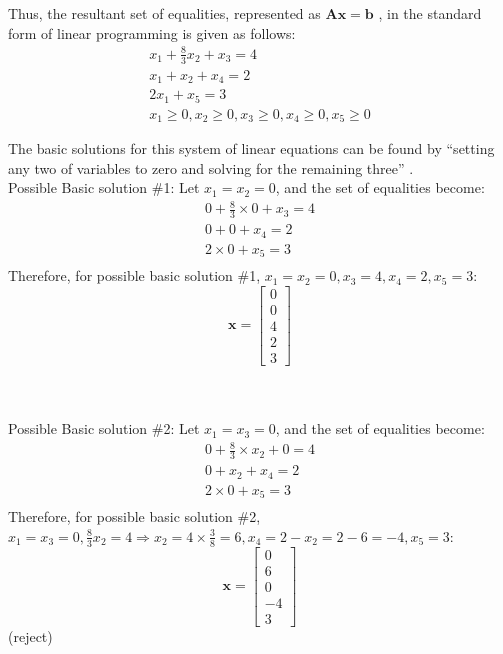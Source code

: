 \documentclass[letter,12pt]{article}
\begin{document}
Thus, the resultant set of equalities, represented as $\mathbf{Ax = b}$ \cite[\S2.1, page 19]{Luenberger2008}, in the standard form \cite[\S2.1, pages 11]{Luenberger2008} of linear programming is given as follows:
\begin{eqnarray*}
x_{1} + \frac{8}{3}x_{2} + x_{3} = 4 \\
x_{1} + x_{2} + x_{4} = 2 \\
2x_{1} + x_{5} = 3 \\
x_{1} \geq 0, x_{2} \geq 0, x_{3} \geq 0, x_{4} \geq 0, x_{5} \geq 0
\end{eqnarray*}

The basic solutions for this system of linear equations can be found by ``setting any two of variables to zero and solving for the remaining three'' \cite[\S2.5, page 26]{Luenberger2008}. \\

Possible Basic solution \#1:
Let $x_{1} = x_{2} = 0$, and the set of equalities become:
\begin{eqnarray*}
0 + \frac{8}{3} \times 0 + x_{3} = 4 \\
0 + 0 + x_{4} = 2 \\
2 \times 0 + x_{5} = 3 \\
\end{eqnarray*}
Therefore, for possible basic solution \#1, $x_{1} = x_{2} = 0, x_{3} = 4, x_{4} = 2, x_{5} = 3$:
\begin{equation}
\mathbf{x} = \left[
	\begin{array}{c}
	0 \\ 0 \\ 4 \\ 2 \\ 3
	\end{array}
	\right]
\end{equation}

\ \\
\ \\

Possible Basic solution \#2:
Let $x_{1} = x_{3} = 0$, and the set of equalities become:
\begin{eqnarray*}
0 + \frac{8}{3} \times x_{2} + 0 = 4 \\
0 + x_{2} + x_{4} = 2 \\
2 \times 0 + x_{5} = 3 \\
\end{eqnarray*}
Therefore, for possible basic solution \#2, $x_{1} = x_{3} = 0, \frac{8}{3} x_{2} = 4 \Rightarrow x_{2} = 4 \times \frac{3}{8} = 6, x_{4} = 2 - x_{2} = 2 - 6 = -4, x_{5} = 3$:
\begin{equation}
\mathbf{x} = \left[
	\begin{array}{c}
	0 \\ 6 \\ 0 \\ -4 \\ 3
	\end{array}
	\right]
\end{equation}
(reject) \\
\ \\
\ \\
\end{document}
